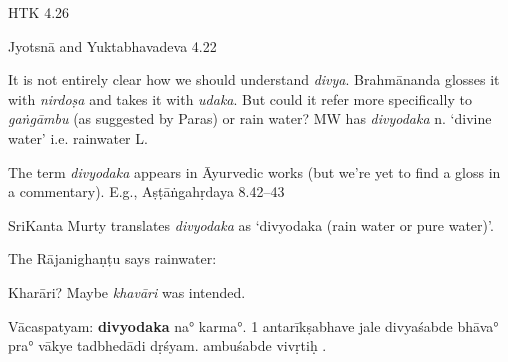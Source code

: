 \begin{ekdosis}
\begin{philcomm}[hp01_062]
HTK 4.26

\begin{versinnote}
\end{versinnote}

Jyotsnā and Yuktabhavadeva 4.22

\begin{versinnote}
\end{versinnote}

It is not entirely clear how we should understand \emph{divya}. Brahmānanda glosses it with \emph{nirdoṣa} and takes it with \emph{udaka}. But could it refer more specifically to \emph{gaṅgāmbu} (as suggested by Paras) or rain water? MW has \emph{divyodaka} n. `divine water' i.e. rainwater L.

The term \emph{divyodaka} appears in Āyurvedic works (but we’re yet to find a gloss in a commentary). E.g.,
Aṣṭāṅgahṛdaya 8.42–43

\begin{versinnote}
\end{versinnote}

SriKanta Murty translates \emph{divyodaka} as ‘divyodaka (rain water or pure water)'.

The Rājanighaṇṭu says rainwater:

\begin{versinnote}
\end{versinnote}

Kharāri? Maybe \emph{khavāri} was intended.

Vācaspatyam:
\textbf{divyodaka} na° karma°.
1 antarīkṣabhave jale divyaśabde bhāva° pra° vākye tadbhedādi dṛśyam.
ambuśabde vivṛtiḥ .


\end{philcomm}
\end{ekdosis}
